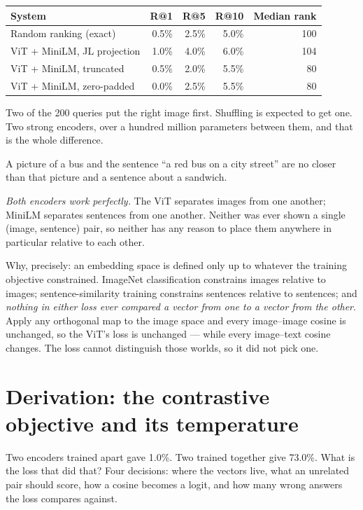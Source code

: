 \documentclass[11pt,a4paper]{article}
\begin{document}
\begin{center}
\small
\begin{tabular}{lrrrr}
\toprule
\textbf{System} & \textbf{R@1} & \textbf{R@5} & \textbf{R@10} &
\textbf{Median rank} \\
\midrule
Random ranking (exact) & 0.5\% & 2.5\% & 5.0\% & 100 \\
ViT + MiniLM, JL projection & 1.0\% & 4.0\% & 6.0\% & 104 \\
ViT + MiniLM, truncated & 0.5\% & 2.0\% & 5.5\% & 80 \\
ViT + MiniLM, zero-padded & 0.0\% & 2.5\% & 5.5\% & 80 \\
\bottomrule
\end{tabular}
\end{center}

Two of the 200 queries put the right image first. Shuffling is expected to get
one. Two strong encoders, over a hundred million parameters between them, and
that is the whole difference.

\begin{keybox}[title={Say the result out loud}]
A picture of a bus and the sentence ``a red bus on a city street'' are no
closer than that picture and a sentence about a sandwich.

\emph{Both encoders work perfectly.} The ViT separates images from one another;
MiniLM separates sentences from one another. Neither was ever shown a single
(image, sentence) pair, so neither has any reason to place them anywhere in
particular relative to each other.
\end{keybox}

Why, precisely: an embedding space is defined only up to whatever the training
objective constrained. ImageNet classification constrains images relative to
images; sentence-similarity training constrains sentences relative to
sentences; and \emph{nothing in either loss ever compared a vector from one to
a vector from the other}. Apply any orthogonal map to the image space and every
image--image cosine is unchanged, so the ViT's loss is unchanged --- while
every image--text cosine changes. The loss cannot distinguish those worlds, so
it did not pick one.

\section{Derivation: the contrastive objective and its temperature}

Two encoders trained apart gave 1.0\%. Two trained together give 73.0\%. What
is the loss that did that? Four decisions: where the vectors live, what an
unrelated pair should score, how a cosine becomes a logit, and how many wrong
answers the loss compares against.
\end{document}

